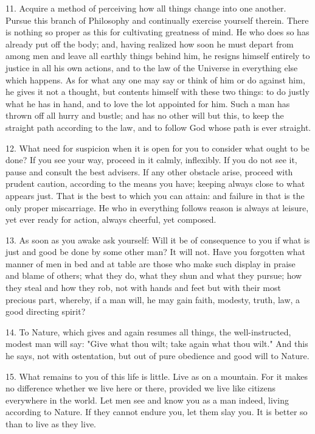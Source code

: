 \documentclass{book}
\begin{document}
11. Acquire a method of perceiving how all things change into one
another. Pursue this branch of Philosophy and continually exercise
yourself therein. There is nothing so proper as this for cultivating
greatness of mind. He who does so has already put off the body; and,
having realized how soon he must depart from among men and leave all
earthly things behind him, he resigns himself entirely to justice in
all his own actions, and to the law of the Universe in everything else
which happens. As for what any one may say or think of him or do
against him, he gives it not a thought, but contents himself with
these two things: to do justly what he has in hand, and to love the
lot appointed for him. Such a man has thrown off all hurry and bustle;
and has no other will but this, to keep the straight path according to
the law, and to follow God whose path is ever straight.

12. What need for suspicion when it is open for you to consider what
ought to be done? If you see your way, proceed in it calmly,
inflexibly. If you do not see it, pause and consult the best
advisers. If any other obstacle arise, proceed with prudent caution,
according to the means you have; keeping always close to what appears
just. That is the best to which you can attain: and failure in that is
the only proper miscarriage. He who in everything follows reason is
always at leisure, yet ever ready for action, always cheerful, yet
composed.

13. As soon as you awake ask yourself: Will it be of consequence to
you if what is just and good be done by some other man? It will
not. Have you forgotten what manner of men in bed and at table are
those who make such display in praise and blame of others; what they
do, what they shun and what they pursue; how they steal and how they
rob, not with hands and feet but with their most precious part,
whereby, if a man will, he may gain faith, modesty, truth, law, a good
directing spirit?

14. To Nature, which gives and again resumes all things, the
well-instructed, modest man will say: "Give what thou wilt; take again
what thou wilt." And this he says, not with ostentation, but out of
pure obedience and good will to Nature.

15. What remains to you of this life is little. Live as on a
mountain. For it makes no difference whether we live here or there,
provided we live like citizens everywhere in the world. Let men see
and know you as a man indeed, living according to Nature. If they
cannot endure you, let them slay you. It is better so than to live as
they live.
\end{document}
